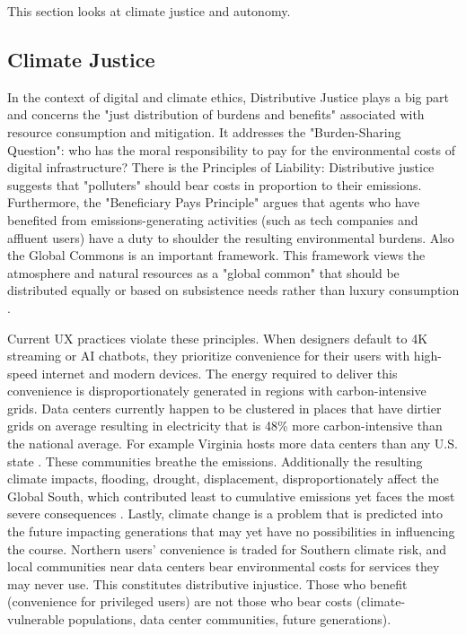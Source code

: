 This section looks at climate justice and autonomy.

\subsection{Climate Justice}
In the context of digital and climate ethics, Distributive Justice plays a big part and concerns the "just distribution of burdens and benefits" associated with resource consumption and mitigation. It addresses the "Burden-Sharing Question": who has the moral responsibility to pay for the environmental costs of digital infrastructure? There is the Principles of Liability: Distributive justice suggests that "polluters" should bear costs in proportion to their emissions. Furthermore, the "Beneficiary Pays Principle" argues that agents who have benefited from emissions-generating activities (such as tech companies and affluent users) have a duty to shoulder the resulting environmental burdens. Also the Global Commons is an important framework. This framework views the atmosphere and natural resources as a "global common" that should be distributed equally or based on subsistence needs rather than luxury consumption \cite{sep-justice-climate}.


\par Current UX practices violate these principles. When designers default to 4K streaming or AI chatbots, they prioritize convenience for their users with high-speed internet and modern devices. The energy required to deliver this convenience is disproportionately generated in regions with carbon-intensive grids. Data centers currently happen to be clustered in places that have dirtier grids on average resulting in electricity that is 48\% more carbon-intensive than the national average. For example Virginia  hosts more data centers than any U.S. state \cite{MIT}. These communities breathe the emissions. Additionally the resulting climate impacts, flooding, drought, displacement, disproportionately affect the Global South, which contributed least to cumulative emissions yet faces the most severe consequences \cite{ColumbiaClimate2025Index, owid-co2-emissions}. Lastly, climate change is a problem that is predicted into the future impacting generations that may yet have no possibilities in influencing the course. Northern users' convenience is traded for Southern climate risk, and local communities near data centers bear environmental costs for services they may never use. This constitutes distributive injustice. Those who benefit (convenience for privileged users) are not those who bear costs (climate-vulnerable populations, data center communities, future generations).

